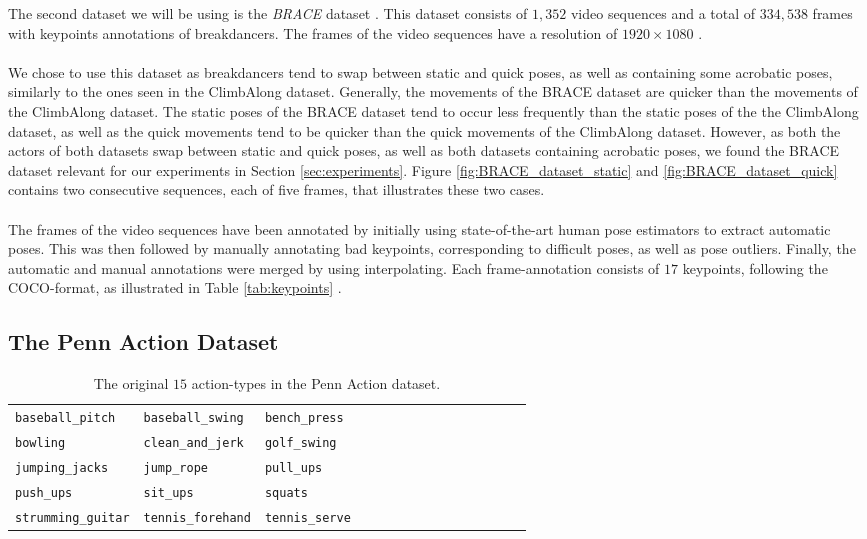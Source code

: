 \documentclass[./main.tex]{subfiles}
\begin{document}
\noindent The second dataset we will be using is the \textit{BRACE} dataset \cite{BRACE}. This dataset consists of $1,352$ video sequences and a total of $334,538$ frames with keypoints annotations of breakdancers. The frames of the video sequences have a resolution of $1920 \times 1080$ \cite{BRACE}.
\\
\\
We chose to use this dataset as breakdancers tend to swap between static and quick poses, as well as containing some acrobatic poses, similarly to the ones seen in the ClimbAlong dataset. Generally, the movements of the BRACE dataset are quicker than the movements of the ClimbAlong dataset. The static poses of the BRACE dataset tend to occur less frequently than the static poses of the the ClimbAlong dataset, as well as the quick movements tend to be quicker than the quick movements of the ClimbAlong dataset. However, as both the actors of both datasets swap between static and quick poses, as well as both datasets containing acrobatic poses, we found the BRACE dataset relevant for our experiments in Section \ref{sec:experiments}. Figure \ref{fig:BRACE_dataset_static} and \ref{fig:BRACE_dataset_quick} contains two consecutive sequences, each of five frames, that illustrates these two cases.
\\
\\
The frames of the video sequences have been annotated by initially using state-of-the-art human pose estimators to extract automatic poses. This was then followed by manually annotating bad keypoints, corresponding to difficult poses, as well as pose outliers. Finally, the automatic and manual annotations were merged by using interpolating. Each frame-annotation consists of $17$ keypoints, following the COCO-format, as illustrated in Table \ref{tab:keypoints} \cite{BRACE}.

\subsection{The Penn Action Dataset}
\begin{table}
    \begin{tabular}[htbp]{lllllllllllllll}
        \texttt{baseball\_pitch} & \texttt{baseball\_swing} & \texttt{bench\_press} \\
        \texttt{bowling} & \texttt{clean\_and\_jerk} & \texttt{golf\_swing} \\
        \texttt{jumping\_jacks} & \texttt{jump\_rope} & \texttt{pull\_ups} \\
        \texttt{push\_ups} & \texttt{sit\_ups} & \texttt{squats} \\
        \texttt{strumming\_guitar} & \texttt{tennis\_forehand} & \texttt{tennis\_serve}
    \end{tabular}
    \caption{The original $15$ action-types in the Penn Action dataset.}
    \label{tab:PA_actions}
\end{table}
\end{document}
